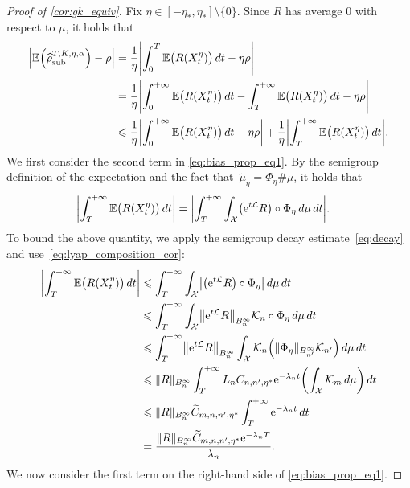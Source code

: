 \documentclass[11pt]{article}
\newcommand{\E}{\mathbb{E}}
\newcommand{\e}{\mathrm{e}}
\renewcommand{\L}{\mathcal{L}}
\renewcommand{\leq}{\leqslant}
\DeclarePairedDelimiter\abs{\lvert}{\rvert}
\DeclarePairedDelimiter\norm{\lVert}{\rVert}
\DeclarePairedDelimiter\paren{\lparen}{\rparen}
\theoremstyle{definition}
\newcommand{\psip}{\widetilde{\mu}_\eta}
\newcommand{\estTmp}{\widehat{\rho}}
\newcommand{\aTSest}{\estTmp^{T,K,\eta,\alpha}_{\rm sub}} %
\begin{document}
\begin{proof}[Proof of \cref{cor:gk_equiv}]
	Fix $\eta \in [-\eta_*, \eta_*] \setminus \{0\}$. Since $R$ has average 0 with respect to $\mu$, it holds that
\begin{align}
\notag
\left|\E\paren*{\aTSest} - \rho\right| &= \frac{1}{\eta}\Biggl|\int_0^T \E\bigl(R(X^\eta_t)\bigr) \, dt - \eta\rho\Biggr| \\
\notag
&= \frac{1}{\eta}\Biggl|\int_0^{+\infty} \E\bigl(R(X^\eta_t)\bigr) \, dt - \int_T^{+\infty} \E\bigl(R(X^\eta_t)\bigr) \, dt - \eta\rho\Biggr| \\
&\leq \frac{1}{\eta}\abs*{\int_0^{+\infty} \E\bigl(R(X^\eta_t)\bigr) \, dt - \eta\rho} + \frac{1}{\eta}\abs*{\int_T^{+\infty} \E\bigl(R(X^\eta_t)\bigr) \, dt}.
\label{eq:bias_prop_eq1}
\end{align}
We first consider the second term in \eqref{eq:bias_prop_eq1}. By the semigroup definition of the expectation and the fact that~$\psip = \Phi_\eta\#\mu$, it holds that
\begin{align}
\notag
		\abs*{\int_T^{+\infty} \E\bigl(R(X^\eta_t)\bigr) \, dt} &= \abs*{\int_T^{+\infty} \int_\mathcal{X} \bigl(\e^{t\L} R\bigr) \circ \Phi_\eta \, d\mu \, dt}.
\end{align}
To bound the above quantity, we apply the semigroup decay estimate~\eqref{eq:decay} and use~\eqref{eq:lyap_composition_cor}: 
\begin{align*}
		\abs*{\int_T^{+\infty} \E\bigl(R(X^\eta_t)\bigr) \, dt} &\leq \int_T^{+\infty} \int_\mathcal{X} \abs*{\bigl(\e^{t\L} R\bigr) \circ \Phi_\eta} \, d\mu \, dt \\
		&\leq \int_T^{+\infty} \int_\mathcal{X} \norm*{\e^{t\L} R}_{B^\infty_n} \mathcal{K}_n \circ \Phi_\eta \, d\mu \, dt \\
		&\leq \int_T^{+\infty} \norm*{\e^{t\L} R}_{B^\infty_n} \int_\mathcal{X} \mathcal{K}_n\paren*{\norm{\Phi_\eta}_{B^\infty_{n'}} \mathcal{K}_{n'}} \, d\mu \, dt \\
		&\leq \norm{R}_{B^\infty_n}\int_T^{+\infty} L_n C_{n,n',\eta^*} \e^{-\lambda_n t} \paren*{\int_\mathcal{X} \mathcal{K}_m \, d\mu} \, dt \\
		&\leq \norm{R}_{B^\infty_n}\widetilde{C}_{m,n,n',\eta^*}\int_T^{+\infty} \e^{-\lambda_n t} \, dt \\
  &= \frac{\norm{R}_{B^\infty_n}\widetilde{C}_{m,n,n',\eta^*}\e^{-\lambda_n T}}{\lambda_n}. \end{align*}
We now consider the first term on the right-hand side of \eqref{eq:bias_prop_eq1}. 

\end{proof}
\end{document}
